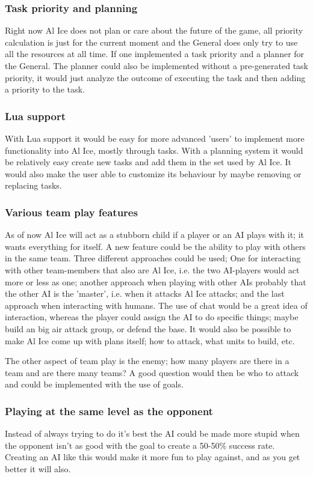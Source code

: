 \subsubsection{Task priority and planning}
Right now Al Ice does not plan or
care about the future of the game, all priority calculation is just for the
current moment and the General does only try to use all the resources at all
time. If one implemented a task priority and a planner for the General. The planner could also be
implemented without a pre-generated task priority, it would just analyze the outcome of executing
the task and then adding a priority to the task.

\subsubsection{Lua support}
With Lua support it would be easy for more advanced 'users' to implement more functionality into Al
Ice, mostly through tasks. With a planning system it would be relatively easy create new tasks and
add them in the set used by Al Ice. It would also make the user able to customize its behaviour by
maybe removing or replacing tasks.

\subsubsection{Various team play features}
As of now Al Ice will act as a stubborn child if a player or an AI plays with it; it wants
everything for itself. A new feature could be the ability to play with others in the same team.
Three different approaches could be used; One for interacting with other team-members that also are
Al Ice, i.e. the two AI-players would act more or less as one; another approach when playing with
other AIs probably that the other AI is the 'master', i.e. when it attacks Al Ice attacks; and the
last approach when interacting with humans. The use of chat would be a great idea of interaction,
whereas the player could assign the AI to do specific things; maybe build an big air attack group,
or defend the base. It would also be possible to make Al Ice come up with plans itself; how to
attack, what units to build, etc.

The other aspect of team play is the enemy; how many players are there in a team and are there many
teams? A good question would then be who to attack and could be implemented with the use of goals.

\subsubsection{Playing at the same level as the opponent}
Instead of always trying to do it's best the AI could be made more stupid when the opponent isn't as
good with the goal to create a 50-50\% success rate. Creating an AI like this would make it more fun
to play against, and as you get better it will also.